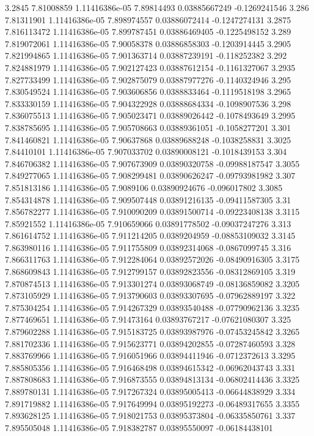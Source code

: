 {3.2845 7.81008859 1.11416386e-05 7.89814493 0.03885667249 -0.1269241546
3.286 7.81311901 1.11416386e-05 7.898974557 0.03886072414 -0.1247274131
3.2875 7.816113472 1.11416386e-05 7.899787451 0.03886469405 -0.1225498152
3.289 7.819072061 1.11416386e-05 7.90058378 0.03886858303 -0.1203914445
3.2905 7.821994865 1.11416386e-05 7.901363714 0.03887239191 -0.118252382
3.292 7.824881979 1.11416386e-05 7.902127423 0.03887612154 -0.1161327067
3.2935 7.827733499 1.11416386e-05 7.902875079 0.03887977276 -0.1140324946
3.295 7.830549524 1.11416386e-05 7.903606856 0.0388833464 -0.1119518198
3.2965 7.833330159 1.11416386e-05 7.904322928 0.03888684334 -0.1098907536
3.298 7.836075513 1.11416386e-05 7.905023471 0.03889026442 -0.1078493649
3.2995 7.838785695 1.11416386e-05 7.905708663 0.03889361051 -0.1058277201
3.301 7.841460821 1.11416386e-05 7.90637868 0.03889688248 -0.1038258831
3.3025 7.84410101 1.11416386e-05 7.907033702 0.03890008121 -0.1018439153
3.304 7.846706382 1.11416386e-05 7.907673909 0.03890320758 -0.09988187547
3.3055 7.849277065 1.11416386e-05 7.908299481 0.03890626247 -0.09793981982
3.307 7.851813186 1.11416386e-05 7.9089106 0.03890924676 -0.096017802
3.3085 7.854314878 1.11416386e-05 7.909507448 0.03891216135 -0.09411587305
3.31 7.856782277 1.11416386e-05 7.910090209 0.03891500714 -0.09223408138
3.3115 7.85921552 1.11416386e-05 7.910659066 0.03891778502 -0.09037247276
3.313 7.861614752 1.11416386e-05 7.911214205 0.0389204959 -0.08853109032
3.3145 7.863980116 1.11416386e-05 7.911755809 0.03892314068 -0.0867099745
3.316 7.866311763 1.11416386e-05 7.912284064 0.03892572026 -0.08490916305
3.3175 7.868609843 1.11416386e-05 7.912799157 0.03892823556 -0.08312869105
3.319 7.870874513 1.11416386e-05 7.913301274 0.03893068749 -0.08136859082
3.3205 7.873105929 1.11416386e-05 7.913790603 0.03893307695 -0.07962889197
3.322 7.875304254 1.11416386e-05 7.914267329 0.03893540488 -0.07790962136
3.3235 7.877469651 1.11416386e-05 7.91473164 0.03893767217 -0.07621080307
3.325 7.879602288 1.11416386e-05 7.915183725 0.03893987976 -0.07453245842
3.3265 7.881702336 1.11416386e-05 7.915623771 0.03894202855 -0.07287460593
3.328 7.883769966 1.11416386e-05 7.916051966 0.03894411946 -0.0712372613
3.3295 7.885805356 1.11416386e-05 7.916468498 0.03894615342 -0.06962043743
3.331 7.887808683 1.11416386e-05 7.916873555 0.03894813134 -0.06802414436
3.3325 7.889780131 1.11416386e-05 7.917267324 0.03895005413 -0.06644838929
3.334 7.891719882 1.11416386e-05 7.917649994 0.03895192273 -0.06489317655
3.3355 7.893628125 1.11416386e-05 7.918021753 0.03895373804 -0.06335850761
3.337 7.895505048 1.11416386e-05 7.918382787 0.03895550097 -0.06184438101
}
